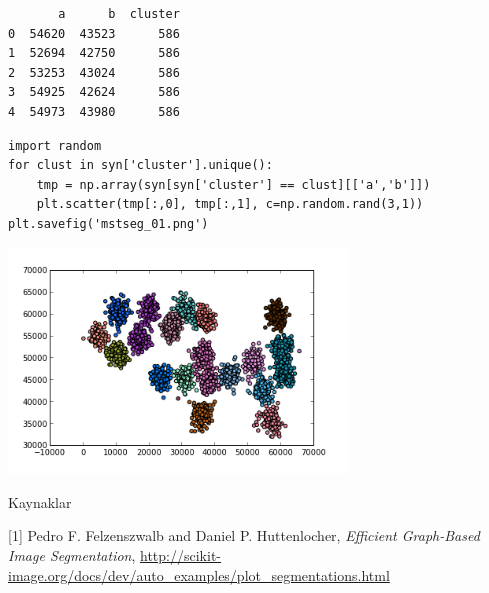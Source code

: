 \documentclass[12pt,fleqn]{article}\usepackage{../common}
\begin{document}
\begin{verbatim}
       a      b  cluster
0  54620  43523      586
1  52694  42750      586
2  53253  43024      586
3  54925  42624      586
4  54973  43980      586
\end{verbatim}

\begin{verbatim}
import random
for clust in syn['cluster'].unique():
    tmp = np.array(syn[syn['cluster'] == clust][['a','b']])
    plt.scatter(tmp[:,0], tmp[:,1], c=np.random.rand(3,1))
plt.savefig('mstseg_01.png')
\end{verbatim}

\includegraphics[height=6cm]{mstseg_01.png}








Kaynaklar

[1] Pedro F. Felzenszwalb and Daniel P. Huttenlocher, {\em Efficient
  Graph-Based Image Segmentation},
\url{http://scikit-image.org/docs/dev/auto_examples/plot_segmentations.html}
\end{document}
